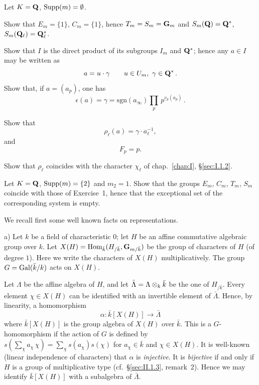 \begin{exercises}
\begin{nlist}
\item[(1)] Let $K = \mathbf{Q}$, $\mathrm{Supp}(m) = \emptyset$.
\begin{alist}[label=\alph*)]
\item Show that $E_m = \{1\}$, $C_m = \{1\}$, hence $T_m = S_m = \mathbf{G}_m$
and $S_m(\mathbf{Q}) = \mathbf{Q}^*$, $S_m(\mathbf{Q}_\ell) = \mathbf{Q}_\ell^*$.
\item Show that $I$ is the direct product of its subgroups $I_m$ and
$\mathbf{Q}^*$; hence any $a \in I$ may be written as
\[
a = u \cdot \gamma \qquad u \in U_m,\ \gamma \in \mathbf{Q}^*\,.
\]
Show that, if $a = (a_p)$, one has
\[
\epsilon(a) = \gamma = \mathrm{sgn}(a_\infty)
\prod_p\, p^{v_p(a_p)}\,.
\]
\item Show that
\[
\rho_\ell(a) = \gamma \cdot a_\ell^{-1},
\]
and
\[
F_p = p.
\]
\item Show that $\rho_\ell$ coincides with the character $\chi_\ell$ of
chap.~\ref{chap:I}, \S\ref{sec:I.1.2}.
\end{alist}

\item[(2)] Let $K = \mathbf{Q}$, $\mathrm{Supp}(m) = \{2\}$ and $m_2 = 1$.  Show that
the groups $E_m$, $C_m$, $T_m$, $S_m$ coincide with those of
Exercise~1, hence that the exceptional set of the corresponding system
is empty.
\end{nlist}
\end{exercises}


We recall first some well known facts on representations.

a) Let $k$ be a field of characteristic $0$; let $H$ be an affine
commutative algebraic group over $k$.  Let
$X(H) = \mathrm{Hom}_{\bar{k}}(H_{/\bar{k}}, \mathbf{G}_{m/\bar{k}})$ be the
group of characters of $H$ (of degree $1$).  Here we write the
characters of $X(H)$ multiplicatively.  The group
$G = \mathrm{Gal}(\bar{k}/k)$ acts on $X(H)$.

Let $\Lambda$ be the affine algebra of $H$, and let
$\bar{\Lambda} = \Lambda \mathbin{\otimes}_k \bar{k}$ be the one of $H_{/\bar{k}}$.
Every element $\chi \in X(H)$ can be identified with an invertible
element of $\bar{\Lambda}$.  Hence, by linearity, a homomorphism
\[
\alpha\colon \bar{k}[X(H)] \longrightarrow \bar{\Lambda}
\]
where $\bar{k}[X(H)]$ is the group algebra of $X(H)$ over $\bar{k}$.
This is a $G$-homomorphism if the action of $G$ is defined by
$s(\sum_\chi a_\chi\,\chi) = \sum_\chi s(a_\chi)s(\chi)$ for
$a_\chi \in \bar{k}$ and $\chi \in X(H)$.  It is well-known (linear
independence of characters) that $\alpha$ is \emph{injective}.  It is
\emph{bijective} if and only if $H$ is a group of multiplicative type
(cf.~\S\ref{sec:II.1.3}, remark~2).  Hence we may identify
$\bar{k}[X(H)]$ with a subalgebra of $\bar{\Lambda}$.

